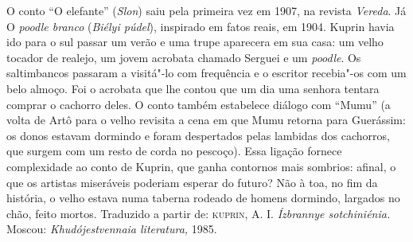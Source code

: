 \medskip


\medskip

O conto ``O elefante'' (\emph{Slon}) saiu pela primeira vez em 1907,
na revista \emph{Vereda}. Já O \emph{poodle branco} (\emph{Biélyi
púdel}), inspirado em fatos reais, em 1904. Kuprin havia ido para o sul
passar um verão e uma trupe aparecera em sua casa: um velho tocador de
realejo, um jovem acrobata chamado Serguei e um \emph{poodle}. Os
saltimbancos passaram a visitá"-lo com frequência e o escritor recebia"-os
com um belo almoço. Foi o acrobata que lhe contou que um dia uma senhora
tentara comprar o cachorro deles. O conto também estabelece diálogo com
``Mumu'' (a volta de Artô para o velho revisita a cena em que Mumu
retorna para Guerássim: os donos estavam dormindo e foram despertados
pelas lambidas dos cachorros, que surgem com um resto de corda no
pescoço). Essa ligação fornece complexidade ao conto de Kuprin, que
ganha contornos mais sombrios: afinal, o que os artistas miseráveis
poderiam esperar do futuro? Não à toa, no fim da história, o velho
estava numa taberna rodeado de homens dormindo, largados no chão, feito mortos.
Traduzido a partir de:
\textsc{kuprin}, A. I. \emph{Ízbrannye sotchiniénia.} Moscou:
\emph{Khudójestvennaia literatura,} 1985.

\medskip


